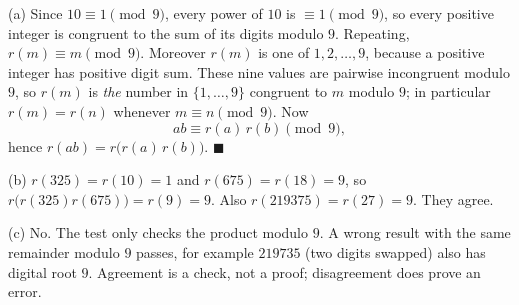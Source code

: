 (a) Since $10\equiv1\pmod9$, every power of $10$ is $\equiv1\pmod9$, so every positive integer is congruent to the sum of its digits modulo $9$. Repeating, $r(m)\equiv m\pmod9$. Moreover $r(m)$ is one of $1,2,\dots,9$, because a positive integer has positive digit sum. These nine values are pairwise incongruent modulo $9$, so $r(m)$ is \emph{the} number in $\{1,\dots,9\}$ congruent to $m$ modulo $9$; in particular $r(m)=r(n)$ whenever $m\equiv n\pmod9$. Now
\[
ab\equiv r(a)\,r(b)\pmod9,
\]
hence $r(ab)=r\bigl(r(a)\,r(b)\bigr)$. $\blacksquare$

(b) $r(325)=r(10)=1$ and $r(675)=r(18)=9$, so $r\bigl(r(325)r(675)\bigr)=r(9)=9$. Also $r(219375)=r(27)=9$. They agree.

(c) No. The test only checks the product modulo $9$. A wrong result with the same remainder modulo $9$ passes, for example $219735$ (two digits swapped) also has digital root $9$. Agreement is a check, not a proof; disagreement does prove an error.
